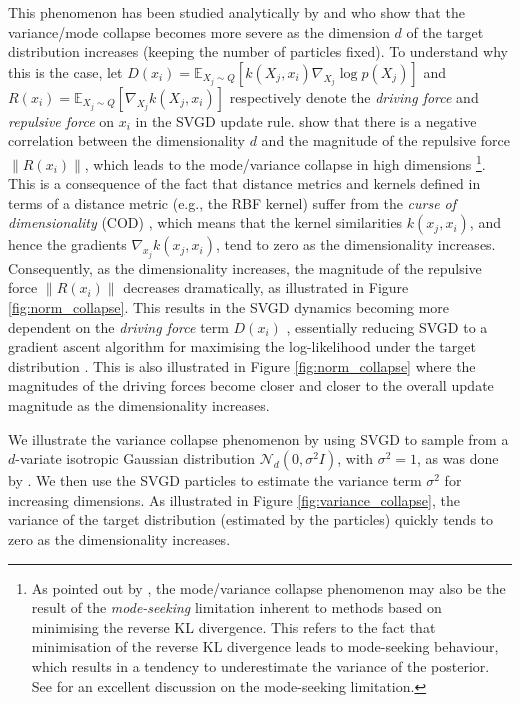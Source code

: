 This phenomenon has been studied analytically by \citet{zhuo_mp_svgd} and \citet{ba_variance_collapse} who show that the variance/mode collapse becomes more severe as the dimension $d$ of the target distribution increases (keeping the number of particles fixed). To understand why this is the case, let $D(x_i) = \mathbb{E}_{X_j \sim Q}\left[ k(X_j, x_i) \nabla_{X_j} \log p(X_j)\right]$ and $R(x_i) = \mathbb{E}_{X_j \sim Q} \left[\nabla_{X_j}k(X_j, x_i) \right]$ respectively denote the \textit{driving force} and \textit{repulsive force} on $x_i$ in the SVGD update rule. \citet{zhuo_mp_svgd} show that there is a negative correlation between the dimensionality $d$ and the magnitude of the repulsive force $\lVert R(x_i) \rVert$, which leads to the mode/variance collapse in high dimensions \footnote{As pointed out by \citet{dangelo_annealed_svgd}, the mode/variance collapse phenomenon may also be the result of the \textit{mode-seeking} limitation inherent to methods based on minimising the reverse KL divergence. This refers to the fact that minimisation of the reverse KL divergence leads to mode-seeking behaviour, which results in a tendency to underestimate the variance of the posterior. See \citet{chan_mode_seeking} for an excellent discussion on the mode-seeking limitation.}.
This is a consequence of the fact that distance metrics and kernels defined in terms of a distance metric (e.g., the RBF kernel) suffer from the \textit{curse of dimensionality} (COD) \citep{spigler_cod, ting_isolation_kernel}, which means that the kernel similarities $k(x_j, x_i)$, and hence the gradients $\nabla_{x_j}k(x_j, x_i)$, tend to zero as the dimensionality increases. Consequently, as the dimensionality increases, the magnitude of the repulsive force $\lVert R(x_i) \rVert$ decreases dramatically, as illustrated in Figure \ref{fig:norm_collapse}. This results in the SVGD dynamics becoming more dependent on the \textit{driving force} term $D(x_i)$ \citep{ba_variance_collapse}, essentially reducing SVGD to a gradient ascent algorithm for maximising the log-likelihood under the target distribution \citep{liu_grassman_svgd}. This is also illustrated in Figure \ref{fig:norm_collapse} where the magnitudes of the driving forces become closer and closer to the overall update magnitude as the dimensionality increases.


We illustrate the variance collapse phenomenon by using SVGD to sample from a $d$-variate isotropic Gaussian distribution $\mathcal{N}_d(0, \sigma^2 I)$, with $\sigma^2 = 1$, as was done by \citet{ba_variance_collapse}. We then use the SVGD particles to estimate the variance term $\sigma^2$ for increasing dimensions. As illustrated in Figure \ref{fig:variance_collapse}, the variance of the target distribution (estimated by the particles) quickly tends to zero as the dimensionality increases.

